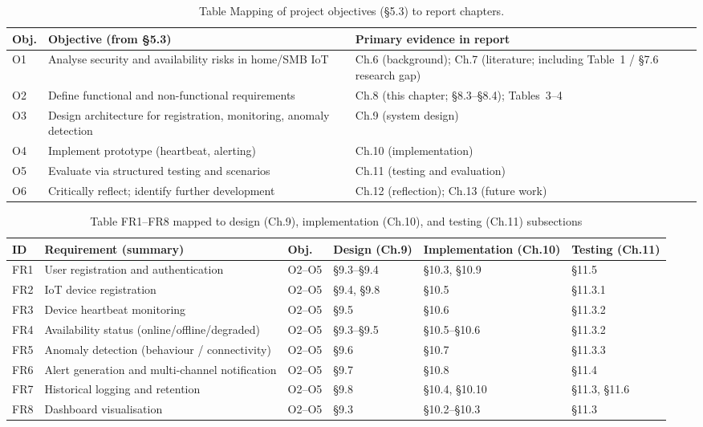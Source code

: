 \begin{table}[htbp]
  \centering
  \small
  \caption{Table  Mapping of project objectives (\S{}5.3) to report chapters.}
  \label{tab:ica1_4}
\begin{tabular}{p{}p{}p{}}
\toprule
Obj. & Objective (from \S{}5.3) & Primary evidence in report \\
\midrule
O1 & Analyse security and availability risks in home/SMB IoT & Ch.6 (background); Ch.7 (literature; including Table~1 / \S{}7.6 research gap) \\
O2 & Define functional and non-functional requirements & Ch.8 (this chapter; \S{}8.3--\S{}8.4); Tables~3--4 \\
O3 & Design architecture for registration, monitoring, anomaly detection & Ch.9 (system design) \\
O4 & Implement prototype (heartbeat, alerting) & Ch.10 (implementation) \\
O5 & Evaluate via structured testing and scenarios & Ch.11 (testing and evaluation) \\
O6 & Critically reflect; identify further development & Ch.12 (reflection); Ch.13 (future work) \\
\bottomrule
\end{tabular}
\end{table}

\begin{table}[htbp]
  \centering
  \small
  \caption{Table  FR1--FR8 mapped to design (Ch.9), implementation (Ch.10), and testing (Ch.11) subsections}
  \label{tab:ica1_5}
\begin{tabular}{p{}p{}p{}p{}p{}p{}}
\toprule
ID & Requirement (summary) & Obj. & Design (Ch.9) & Implementation (Ch.10) & Testing (Ch.11) \\
\midrule
FR1 & User registration and authentication & O2--O5 & \S{}9.3--\S{}9.4 & \S{}10.3, \S{}10.9 & \S{}11.5 \\
FR2 & IoT device registration & O2--O5 & \S{}9.4, \S{}9.8 & \S{}10.5 & \S{}11.3.1 \\
FR3 & Device heartbeat monitoring & O2--O5 & \S{}9.5 & \S{}10.6 & \S{}11.3.2 \\
FR4 & Availability status (online/offline/degraded) & O2--O5 & \S{}9.3--\S{}9.5 & \S{}10.5--\S{}10.6 & \S{}11.3.2 \\
FR5 & Anomaly detection (behaviour / connectivity) & O2--O5 & \S{}9.6 & \S{}10.7 & \S{}11.3.3 \\
FR6 & Alert generation and multi-channel notification & O2--O5 & \S{}9.7 & \S{}10.8 & \S{}11.4 \\
FR7 & Historical logging and retention & O2--O5 & \S{}9.8 & \S{}10.4, \S{}10.10 & \S{}11.3, \S{}11.6 \\
FR8 & Dashboard visualisation & O2--O5 & \S{}9.3 & \S{}10.2--\S{}10.3 & \S{}11.3 \\
\bottomrule
\end{tabular}
\end{table}

